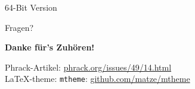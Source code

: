 \documentclass[aspectratio=169]{beamer}
\begin{document}
\begin{frame}{64-Bit Version}

\end{frame}

\begin{frame}{Fragen?}
\end{frame}

\begin{frame}[plain]{}
\begin{center}
{\large \textbf{Danke für's Zuhören!}}
\end{center}
\vfill
Phrack-Artikel: \url{phrack.org/issues/49/14.html}\\
\LaTeX -theme: \texttt{mtheme}: \url{github.com/matze/mtheme} \hfill \ccbysa
\end{frame}
\end{document}
